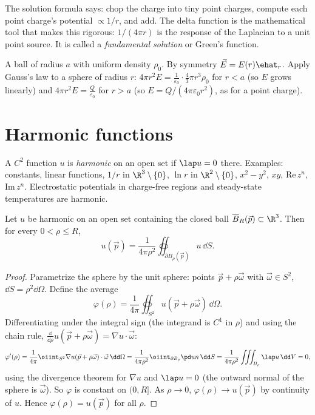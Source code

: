 \begin{intuition}
The solution formula says: chop the charge into tiny point charges, compute each point charge's potential $\propto1/r$, and add. The delta function is the mathematical tool that makes this rigorous: $1/(4\pi r)$ is the response of the Laplacian to a unit point source. It is called a \emph{fundamental solution} or Green's function.
\end{intuition}

\begin{example}
A ball of radius $a$ with uniform density $\rho_0$. By symmetry $\vec E=E(r)\ehat_r$. Apply Gauss's law to a sphere of radius $r$: $4\pi r^2E=\frac1{\varepsilon_0}\cdot\frac43\pi r^3\rho_0$ for $r<a$ (so $E$ grows linearly) and $4\pi r^2E=\frac{Q}{\varepsilon_0}$ for $r>a$ (so $E=Q/(4\pi\varepsilon_0r^2)$, as for a point charge).
\end{example}

\section{Harmonic functions}

A $C^2$ function $u$ is \emph{harmonic} on an open set if $\lap u=0$ there. Examples: constants, linear functions, $1/r$ in $\R^3\setminus\{0\}$, $\ln r$ in $\R^2\setminus\{0\}$, $x^2-y^2$, $xy$, $\mathrm{Re}\,z^n$, $\mathrm{Im}\,z^n$. Electrostatic potentials in charge-free regions and steady-state temperatures are harmonic.

\begin{theorem}\label{thm:mvp}
Let $u$ be harmonic on an open set containing the closed ball $\overline B_R(\vec p)\subset\R^3$. Then for every $0<\rho\le R$,
\[
u(\vec p)=\frac1{4\pi\rho^2}\oiint_{\partial B_\rho(\vec p)}u\,\dd S .
\]
\end{theorem}

\begin{proof}
Parametrize the sphere by the unit sphere: points $\vec p+\rho\vec\omega$ with $\vec\omega\in S^2$, $\dd S=\rho^2\dd\Omega$. Define the average
\[
\varphi(\rho)=\frac1{4\pi}\oiint_{S^2}u(\vec p+\rho\vec\omega)\,\dd\Omega .
\]
Differentiating under the integral sign (the integrand is $C^1$ in $\rho$) and using the chain rule, $\frac{\dd}{\dd\rho}u(\vec p+\rho\vec\omega)=\nabla u\cdot\vec\omega$:
\[
\varphi'(\rho)=\frac1{4\pi}\oiint_{S^2}\nabla u(\vec p+\rho\vec\omega)\cdot\vec\omega\,\dd\Omega=\frac1{4\pi\rho^2}\oiint_{\partial B_\rho}\pd un\,\dd S=\frac1{4\pi\rho^2}\iiint_{B_\rho}\lap u\,\dd V=0,
\]
using the divergence theorem for $\nabla u$ and $\lap u=0$ (the outward normal of the sphere is $\vec\omega$). So $\varphi$ is constant on $(0,R]$. As $\rho\to0$, $\varphi(\rho)\to u(\vec p)$ by continuity of $u$. Hence $\varphi(\rho)=u(\vec p)$ for all $\rho$.
\end{proof}


